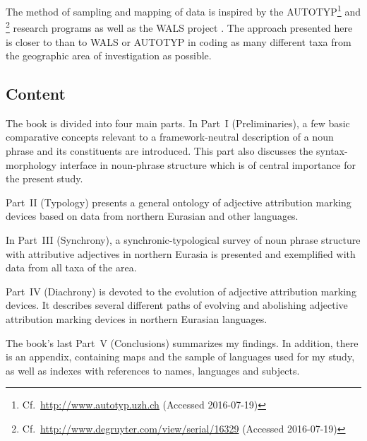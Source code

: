 The method of sampling and mapping of data is inspired by the \textsc{AUTOTYP}\footnote{Cf.~\url{http://www.autotyp.uzh.ch} (Accessed 2016-07-19)} and \textsc{}\footnote{Cf.~\url{http://www.degruyter.com/view/serial/16329} (Accessed 2016-07-19)} research programs as well as the \textsc{WALS} project \citep{walsOnline2013}. The approach presented here is closer to \textsc{} than to \textsc{WALS} or \textsc{AUTOTYP} in coding as many different taxa from the geographic area of investigation as possible.

\subsection*{Content}
The book is divided into four main parts. In Part~I (Preliminaries), a few basic comparative concepts relevant to a framework-neutral description of a noun phrase and its constituents are introduced. This part also discusses the syntax-morphology interface in noun-phrase structure which is of central importance for the present study.

Part~II (Typology) presents a general ontology of adjective attribution marking devices based on data from northern Eurasian and other languages.

In Part~III (Synchrony), a synchronic-typological survey of noun phrase structure with attributive adjectives in northern Eurasia is presented and exemplified with data from all taxa of the area.

Part~IV (Diachrony) is devoted to the evolution of adjective attribution marking devices. It describes several different paths of evolving and abolishing adjective attribution marking devices in northern Eurasian languages.

The book's last Part~V (Conclusions) summarizes my findings. In addition, there is an appendix, containing maps and the sample of languages used for my study, as well as indexes with references to names, languages and subjects.
